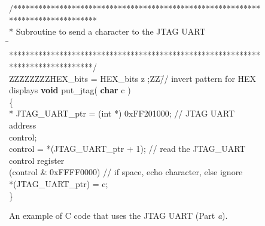\begin{figure}[h!]
\begin{center}
\begin{minipage}[t]{12.5 cm}
\begin{tabbing}
/********************************************************************************\\
\>* Subroutine to send a character to the JTAG UART\\
\=\kill
\>********************************************************************************/\\
ZZ\=ZZZ\=ZZZ\=HEX\_bits = HEX\_bits z ;ZZ\=// invert pattern for HEX displays\kill
{\bf void} put\_jtag( {\bf char} c )\\
\{\\
 * JTAG\_UART\_ptr 	= (int *) 0xFF201000;  // JTAG UART address\\
 control;\\
\>control = *(JTAG\_UART\_ptr + 1);	\>\>\>// read the JTAG\_UART control register\\
 (control \& 0xFFFF0000) \>\>\>// if space, echo character, else ignore \\
\>\>*(JTAG\_UART\_ptr) = c;\\
\}\\
\end{tabbing}
\end{minipage}
\end{center}
	\vspace{-0.33in}\caption{An example of C code that uses the JTAG UART (Part {\it a}).}
   \label{fig:jtag_uart_C}
\end{figure}
\pagebreak
\clearpage
\newpage
